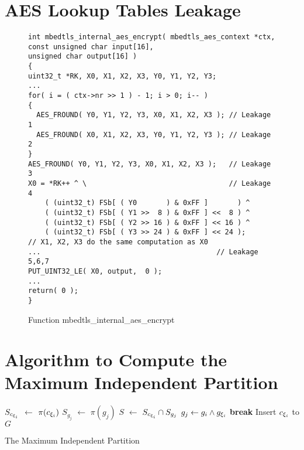 
\newcommand{\vvv}{\vspace*{-3pt}}

\section{AES Lookup Tables Leakage}
\begin{figure}[h!]
    \centering
    \begin{lstlisting}[xleftmargin=.01\textwidth,xrightmargin=.01\textwidth]
int mbedtls_internal_aes_encrypt( mbedtls_aes_context *ctx,
const unsigned char input[16],
unsigned char output[16] )
{
uint32_t *RK, X0, X1, X2, X3, Y0, Y1, Y2, Y3;
...
for( i = ( ctx->nr >> 1 ) - 1; i > 0; i-- )
{
  AES_FROUND( Y0, Y1, Y2, Y3, X0, X1, X2, X3 ); // Leakage 1
  AES_FROUND( X0, X1, X2, X3, Y0, Y1, Y2, Y3 ); // Leakage 2
}
AES_FROUND( Y0, Y1, Y2, Y3, X0, X1, X2, X3 );   // Leakage 3
X0 = *RK++ ^ \                                  // Leakage 4
    ( (uint32_t) FSb[ ( Y0       ) & 0xFF ]       ) ^
    ( (uint32_t) FSb[ ( Y1 >>  8 ) & 0xFF ] <<  8 ) ^
    ( (uint32_t) FSb[ ( Y2 >> 16 ) & 0xFF ] << 16 ) ^
    ( (uint32_t) FSb[ ( Y3 >> 24 ) & 0xFF ] << 24 );
// X1, X2, X3 do the same computation as X0
...                                          // Leakage 5,6,7
PUT_UINT32_LE( X0, output,  0 );
...
return( 0 );
}
\end{lstlisting}
    \vspace*{-6pt}
    \caption{Function \textsf{mbedtls\_internal\_aes\_encrypt}}
    \label{mbedtls_aes}
    \vspace*{-9pt}
\end{figure}

\section{Algorithm to Compute the Maximum Independent Partition}
\label{appendix:partition}
{\small
\IncMargin{1em}
\begin{algorithm}[h]\small
    \DontPrintSemicolon
    {
        $S_{c_{{\xi}_{i}}}$ $\leftarrow$ $\pi(c_{{\xi}_{i}})$ \;
        {
            $S_{g_j}$ $\leftarrow$ $\pi(g_{j})$ \;
            $S$ $\leftarrow$ $S_{c_{{\xi}_{i}}} \cap S_{g_j}$  \;
            {
                $g_{j} \leftarrow g_{i} \land g_{{\xi}_{i}}$ \;
                \textbf{break} \;
            }
            Insert $c_{{\xi}_{i}}$ to $G$
        }
    }
    \caption{The Maximum Independent Partition}
    \label{algo:max-inde}
\end{algorithm}
\DecMargin{1em}
}
~

